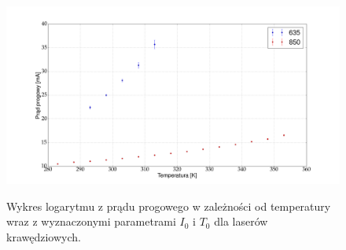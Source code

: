 \documentclass[a4paper, portrait,12pt]{report}
\begin{document}
\begin{figure}
\center
  \includegraphics[scale=0.30]{plotAll/wykres_krawedziowy_prad_progowy.png}
  \label{rys1}
  \caption{Wykres logarytmu z prądu progowego w zależności od temperatury wraz z wyznaczonymi parametrami $I_0$ i $T_0$ dla laserów krawędziowych.} 
\end{figure}
\end{document}
